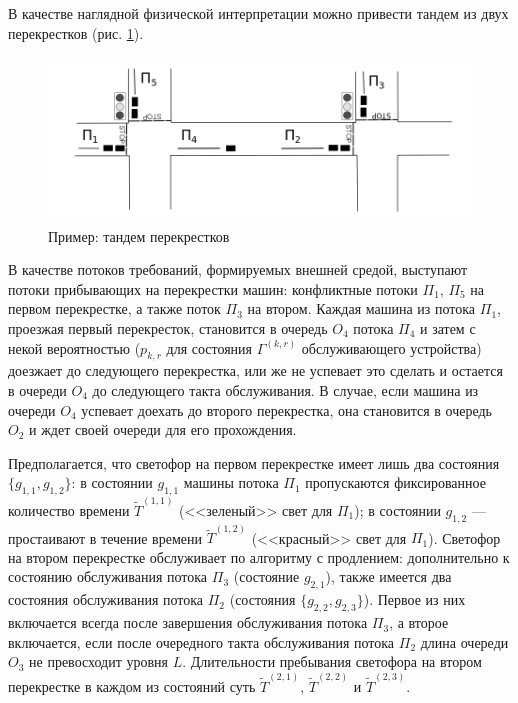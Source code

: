 \documentclass[a4paper,12pt,russian]{extarticle}
\begin{document}
В качестве наглядной физической интерпретации можно привести тандем из двух перекрестков (рис. \ref{crossroads}).
\begin{figure}[h]
\includegraphics[scale=0.5]{Crossroads_grayscale.png} 
\caption{Пример: тандем перекрестков}
\label{crossroads}
\end{figure}
В качестве потоков требований, формируемых внешней средой, выступают потоки прибывающих на перекрестки машин: конфликтные потоки $\Pi_1$, $\Pi_5$ на первом перекрестке, а также поток $\Pi_3$ на втором. Каждая машина из потока $\Pi_1$, проезжая первый перекресток, становится в очередь $O_4$ потока $\Pi_4$ и затем с некой вероятностью ($p_{k,r}$ для состояния $\Gamma^{(k,r)}$ обслуживающего устройства) доезжает до следующего перекрестка, или же не успевает это сделать и остается в очереди $O_4$ до следующего такта обслуживания. В случае, если машина из очереди $O_4$ успевает доехать до второго перекрестка, она становится в очередь $O_2$ и ждет своей очереди для его прохождения.

Предполагается, что светофор на первом перекрестке имеет лишь два состояния $\{g_{1,1},g_{1,2}\}$: в состоянии $g_{1,1}$ машины потока $\Pi_1$ пропускаются фиксированное количество времени $\widetilde T^{(1,1)}$ (<<зеленый>> свет для $\Pi_1$); в состоянии $g_{1,2}$ --- простаивают в течение времени $\widetilde T^{(1,2)}$ (<<красный>> свет для $\Pi_1$). Светофор на втором перекрестке обслуживает по алгоритму с продлением: дополнительно к состоянию обслуживания потока $\Pi_3$ (состояние $g_{2,1}$), также имеется два состояния обслуживания потока $\Pi_2$ (состояния $\{g_{2,2},g_{2,3}\}$). Первое из них включается всегда после завершения обслуживания потока $\Pi_3$, а второе включается, если после очередного такта обслуживания потока $\Pi_2$ длина очереди $O_3$ не превосходит уровня $L$.
Длительности пребывания светофора на втором перекрестке в каждом из состояний суть $\widetilde T^{(2,1)}$, $\widetilde T^{(2,2)}$ и $\widetilde T^{(2,3)}$.
\end{document}
